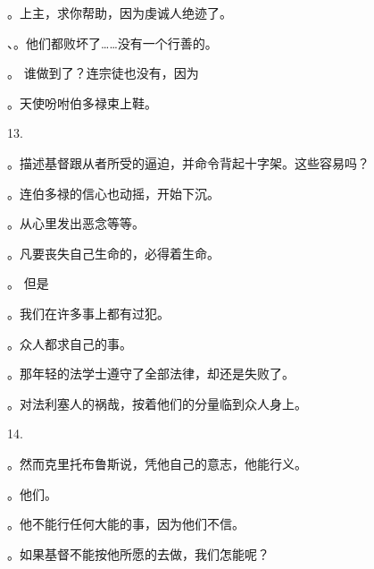。上主，求你帮助，因为虔诚人绝迹了。\par

、。他们都败坏了……没有一个行善的。\par

。 谁做到了？连宗徒也没有，因为\par

。天使吩咐伯多禄束上鞋。\par

13.\par

。描述基督跟从者所受的逼迫，并命令背起十字架。这些容易吗？\par

。连伯多禄的信心也动摇，开始下沉。\par

。从心里发出恶念等等。\par

。凡要丧失自己生命的，必得着生命。\par

。 但是\par

。我们在许多事上都有过犯。\par

。众人都求自己的事。\par

。那年轻的法学士遵守了全部法律，却还是失败了。\par

。对法利塞人的祸哉，按着他们的分量临到众人身上。\par

14.\par

。然而克里托布鲁斯说，凭他自己的意志，他能行义。\par

。他们。\par

。他不能行任何大能的事，因为他们不信。\par

。如果基督不能按他所愿的去做，我们怎能呢？\par

